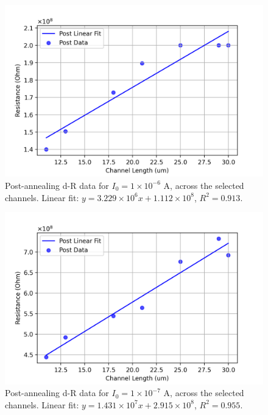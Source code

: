 \begin{figure}[h]
    \centering
    \includegraphics[width=\textwidth]{Chapter3/Figs/Raster/Sample F 2022/Post-anneal/1e-06A.png}
    \caption{Post-annealing d-R data for $I_{0}=1\times10^{-6}$ \si{\ampere}, across the selected channels. Linear fit: $y = 3.229\times10^{6}x + 1.112\times10^{8}$, $R^{2}=0.913$.}
    \label{fig:post-anneal-dr-1e-6}
\end{figure}
\begin{figure}[H]
    \centering
    \includegraphics[width=\textwidth]{Chapter3/Figs/Raster/Sample F 2022/Post-anneal/1e-07A.png}
    \caption{Post-annealing d-R data for $I_{0}=1\times10^{-7}$ \si{\ampere}, across the selected channels. Linear fit: $y = 1.431\times10^{7}x + 2.915\times10^{8}$, $R^{2}=0.955$.}
    \label{fig:post-anneal-dr-1e-7}
\end{figure}

